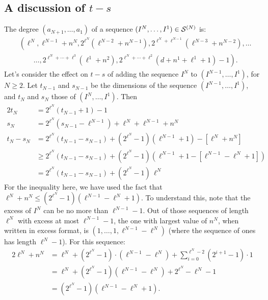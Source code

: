 \documentclass[10pt]{article}
\begin{document}
\begin{conjectured differentials}
\subsection{A discussion of $t-s$}
The degree $ (a_{N+1},\ldots,a_1) $ of a sequence $(I^N,\ldots,I^1)\in\mathcal{S}^{(N)}$ is:
\begin{align*}
& \left( \ell^N,\ell^{N-1}+n^N,2^{\ell^N}\!\left(\ell^{N-2}+n^{N-1}\right), 2^{\ell^N+\ell^{N-1}}\!\left(\ell^{N-3}+n^{N-2}\right),\ldots \right.\\
 &\qquad \left.{}\ldots,2^{\ell^N+\cdots+\ell^{3}}(\ell^1+n^2),2^{\ell^N+\cdots+\ell^{2}}(d+n^1+\ell^1+1)-1 \right).
\end{align*}
Let's consider the effect on $t-s$ of adding the sequence $I^N$ to $(I^{N-1},\ldots,I^1)$, for $N\geq2$. Let $t_{N-1}$ and $s_{N-1}$ be the dimensions of the sequence $(I^{N-1},\ldots,I^1)$, and $t_N$ and $s_N$ those of $(I^{N},\ldots,I^1)$. Then
\begin{alignat*}{2}
t_N
&=
2^{\ell^N}(t_{N-1}+1)-1%
\\
s_N&=
2^{\ell^N}(s_{N-1}-\ell^{N-1})+\ell^{N}+\ell^{N-1}+n^N%
\\
t_N-s_N&=
2^{\ell^N}(t_{N-1}-s_{N-1})+(2^{\ell^N}-1)(\ell^{N-1}+1)-[\ell^{N}+n^N]%
\\
&\geq
2^{\ell^N}(t_{N-1}-s_{N-1})+(2^{\ell^N}-1)(\ell^{N-1}+1-[\ell^{N-1}-\ell^N+1])%
\\
&=
2^{\ell^N}(t_{N-1}-s_{N-1})+(2^{\ell^N}-1)\,\ell^{N}%
\end{alignat*}
For the inequality here, we have used the fact that $\ell^N+n^N\leq(2^{\ell^N}-1)(\ell^{N-1}-\ell^N+1)$. To understand this, note that the excess of $I^N$ can be no more than $\ell^{N-1}-1$. Out of those sequences of length $\ell^N$ with excess at most $\ell^{N-1}-1$, the one with largest value of $n^N$, when written in excess format, is $(1,\ldots,1,\ell^{N-1}-\ell^N)$ (where the sequence of ones has length $\ell^N-1$). For this sequence:
\begin{alignat*}{2}
\ell^N+n^N
&=
\ell^N+(2^{\ell^N}-1)\cdot(\ell^{N-1}-\ell^N)+ \textstyle\sum_{i=0}^{\ell^N-2}\left(2^{i+1}-1\right)\cdot 1%
\\
&=
\ell^N+(2^{\ell^N}-1)(\ell^{N-1}-\ell^N)+2^{\ell^N}-\ell^N-1%
\\
&=
(2^{\ell^N}-1)(\ell^{N-1}-\ell^N+1).%
\end{alignat*}


\end{conjectured differentials}
\end{document}
